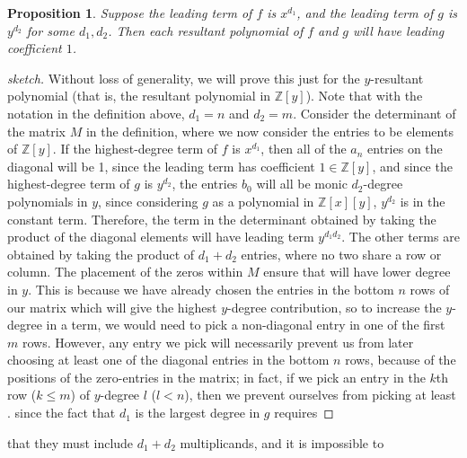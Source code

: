 \documentclass[11pt]{report}
\newtheorem{proposition}{Proposition}
\newcommand{\Zx}{\mathbb{Z}[x]}
\newcommand{\Zy}{\mathbb{Z}[y]}
\begin{document}
\begin{proposition}
Suppose the leading term of $f$ is $x^{d_1}$, and the leading term of $g$ is $y^{d_2}$ for some $d_1, d_2$. Then each resultant polynomial of $f$ and $g$ will have leading coefficient $1$.
\end{proposition}
\begin{proof}[sketch]
Without loss of generality, we will prove this just for the $y$-resultant polynomial (that is, the resultant polynomial in $\Zy$). Note that with the notation in the definition above, $d_1 = n$ and $d_2=m$. Consider the determinant of the matrix $M$ in the definition, where we now consider the entries to be elements of $\Zy$. If the highest-degree term of $f$ is $x^{d_1}$, then all of the $a_n$ entries on the diagonal will be 1, since the leading term has coefficient $1\in \Zy$, and since the highest-degree term of $g$ is $y^{d_2}$, the entries $b_0$ will all be monic $d_2$-degree polynomials in $y$, since considering $g$ as a polynomial in $\Zx[y]$, $y^{d_2}$ is in the constant term. Therefore, the term in the determinant obtained by taking the product of the diagonal elements will have leading term $y^{d_1d_2}$. The other terms are obtained by taking the product of $d_1+d_2$ entries, where no two share a row or column. The placement of the zeros within $M$ ensure that  will have lower degree in $y$. This is because we have already chosen the entries in the bottom $n$ rows of our matrix which will give the highest $y$-degree contribution, so to increase the $y$-degree in a term, we would need to pick a non-diagonal entry in one of the first $m$ rows. However, any entry we pick will necessarily prevent us from later choosing at least one of the diagonal entries in the bottom $n$ rows, because of the positions of the zero-entries in the matrix; in fact, if we pick an entry in the $k$th row ($k\leq m$) of $y$-degree $l$ ($l<n$), then we prevent ourselves from picking at least .  since the fact that $d_1$ is the largest degree in $g$ requires 
\end{proof}

that they must include $d_1+d_2$ multiplicands, and it is impossible to 
\end{document}
